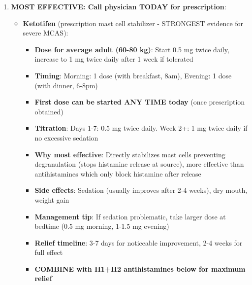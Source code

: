 \begin{enumerate}
    \item \textbf{MOST EFFECTIVE: Call physician TODAY for prescription}:
    \begin{itemize}
        \item \textbf{Ketotifen} (prescription mast cell stabilizer - STRONGEST evidence for severe MCAS):
        \begin{itemize}
            \item \textbf{Dose for average adult (60-80 kg)}: Start 0.5 mg twice daily, increase to 1 mg twice daily after 1 week if tolerated
            \item \textbf{Timing}: Morning: 1 dose (with breakfast, 8am), Evening: 1 dose (with dinner, 6-8pm)
            \item \textbf{First dose can be started ANY TIME today} (once prescription obtained)
            \item \textbf{Titration}: Days 1-7: 0.5 mg twice daily. Week 2+: 1 mg twice daily if no excessive sedation
            \item \textbf{Why most effective}: Directly stabilizes mast cells preventing degranulation (stops histamine release at source), more effective than antihistamines which only block histamine after release
            \item \textbf{Side effects}: Sedation (usually improves after 2-4 weeks), dry mouth, weight gain
            \item \textbf{Management tip}: If sedation problematic, take larger dose at bedtime (0.5 mg morning, 1-1.5 mg evening)
            \item \textbf{Relief timeline}: 3-7 days for noticeable improvement, 2-4 weeks for full effect
            \item \textbf{COMBINE with H1+H2 antihistamines below for maximum relief}
        \end{itemize}


\end{itemize}
\end{enumerate}
